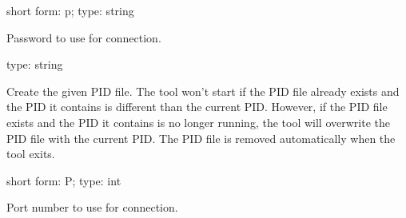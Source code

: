 \documentclass[letterpaper,10pt,english]{sphinxmanual}
\begin{document}
\begin{fulllineitems}
\label{\detokenize{mariadb-config-diff:cmdoption-mariadb-config-diff-password}}
\sphinxAtStartPar
short form: \sphinxhyphen{}p; type: string

\sphinxAtStartPar
Password to use for connection.

\end{fulllineitems}


\begin{fulllineitems}
\label{\detokenize{mariadb-config-diff:cmdoption-mariadb-config-diff-pid}}
\sphinxAtStartPar
type: string

\sphinxAtStartPar
Create the given PID file.  The tool won’t start if the PID file already
exists and the PID it contains is different than the current PID.  However,
if the PID file exists and the PID it contains is no longer running, the
tool will overwrite the PID file with the current PID.  The PID file is
removed automatically when the tool exits.

\end{fulllineitems}


\begin{fulllineitems}
\label{\detokenize{mariadb-config-diff:cmdoption-mariadb-config-diff-port}}
\sphinxAtStartPar
short form: \sphinxhyphen{}P; type: int

\sphinxAtStartPar
Port number to use for connection.

\end{fulllineitems}
\end{document}
